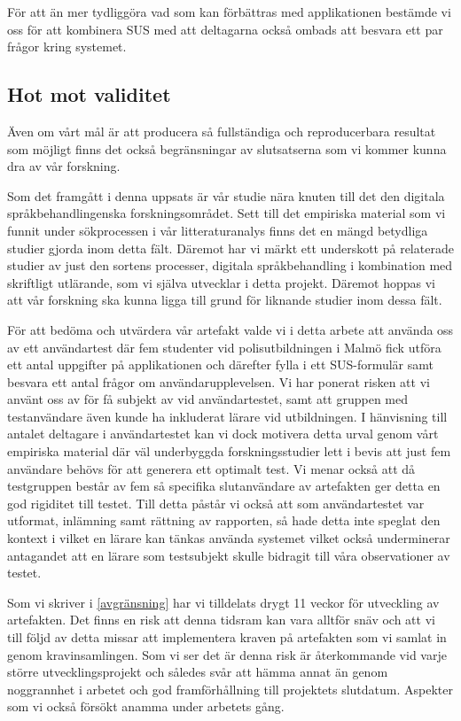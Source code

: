 \documentclass[swedish]{maucsthesis}
\begin{document}
För att än mer tydliggöra vad som kan förbättras med applikationen bestämde vi
oss för att kombinera SUS med att deltagarna också ombads att besvara ett par
frågor kring systemet.

\subsection{Hot mot validitet}

Även om vårt mål är att producera så fullständiga och reproducerbara resultat
som möjligt finns det också begränsningar av slutsatserna som vi kommer kunna
dra av vår forskning.

Som det framgått i denna uppsats är vår studie nära knuten till det
den digitala språkbehandlingenska forskningsområdet. Sett till det empiriska material som vi
funnit under sökprocessen i vår litteraturanalys finns det en mängd betydliga
studier gjorda inom detta fält. Däremot har vi märkt ett underskott på
relaterade studier av just den sortens processer, digitala språkbehandling i kombination
med skriftligt utlärande, som vi själva utvecklar i detta projekt. Däremot
hoppas vi att vår forskning ska kunna ligga till grund för liknande studier inom
dessa fält.

För att bedöma och utvärdera vår artefakt valde vi i detta arbete att använda
oss av ett användartest där fem studenter vid polisutbildningen i Malmö fick
utföra ett antal uppgifter på applikationen och därefter fylla i ett
SUS-formulär samt besvara ett antal frågor om användarupplevelsen. Vi har
ponerat risken att vi använt oss av för få subjekt av vid användartestet, samt
att gruppen med testanvändare även kunde ha inkluderat lärare vid utbildningen.
I hänvisning till antalet deltagare i användartestet kan vi dock motivera detta
urval genom vårt empiriska material där väl underbyggda forskningsstudier lett i
bevis att just fem användare behövs för att generera ett optimalt test. Vi menar
också att då testgruppen består av fem så specifika slutanvändare av artefakten
ger detta en god rigiditet till testet. Till detta påstår vi också att som
användartestet var utformat, inlämning samt rättning av rapporten, så hade detta
inte speglat den kontext i vilket en lärare kan tänkas använda systemet vilket
också underminerar antagandet att en lärare som testsubjekt skulle bidragit till
våra observationer av testet.

Som vi skriver i \cref{avgränsning} har vi tilldelats drygt 11 veckor
för utveckling av artefakten. Det finns en risk att denna tidsram kan vara
alltför snäv och att vi till följd av detta missar att implementera kraven på
artefakten som vi samlat in genom kravinsamlingen. Som vi ser det är denna risk
är återkommande vid varje större utvecklingsprojekt och således svår att hämma
annat än genom noggrannhet i arbetet och god framförhållning till projektets
slutdatum. Aspekter som vi också försökt anamma under arbetets gång.
\end{document}
